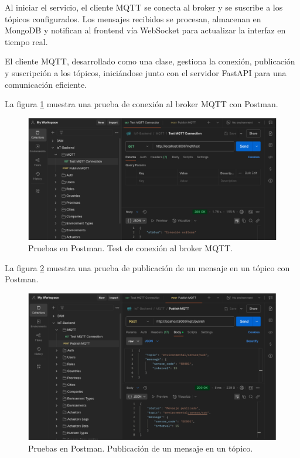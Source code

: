 Al iniciar el servicio, el cliente MQTT se conecta al broker y se suscribe a
los tópicos configurados. Los mensajes recibidos se procesan, almacenan en
MongoDB y notifican al frontend vía WebSocket para actualizar la interfaz en
tiempo real.

El cliente MQTT, desarrollado como una clase, gestiona la conexión, publicación
y suscripción a los tópicos, iniciándose junto con el servidor FastAPI para una
comunicación eficiente.

La figura \ref{fig:test_mqtt} muestra una prueba de conexión al broker MQTT con
Postman.

\begin{figure}[H]
    \centering
    \includegraphics[width=.99\textwidth]{./Images/19.png}
    \caption{Pruebas en Postman. Test de conexión al broker MQTT.}
    \label{fig:test_mqtt}
\end{figure}

La figura \ref{fig:test_mqtt_1} muestra una prueba de publicación de un mensaje
en un tópico con Postman.

\begin{figure}[H]
    \centering
    \includegraphics[width=.99\textwidth]{./Images/20.png}
    \caption{Pruebas en Postman. Publicación de un mensaje en un tópico.}
    \label{fig:test_mqtt_1}
\end{figure}

